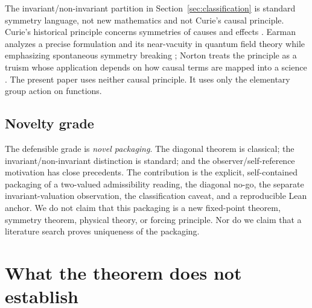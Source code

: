 \documentclass[11pt]{article}
\theoremstyle{definition}
\theoremstyle{remark}
\begin{document}
The invariant/non-invariant partition in Section~\ref{sec:classification} is standard symmetry language, not new mathematics and not Curie's causal principle. Curie's historical principle concerns symmetries of causes and effects \cite{curie1894}. Earman analyzes a precise formulation and its near-vacuity in quantum field theory while emphasizing spontaneous symmetry breaking \cite{earman2004}; Norton treats the principle as a truism whose application depends on how causal terms are mapped into a science \cite{norton2016}. The present paper uses neither causal principle. It uses only the elementary group action on functions.

\subsection{Novelty grade}

The defensible grade is \emph{novel packaging}. The diagonal theorem is classical; the invariant/non-invariant distinction is standard; and the observer/self-reference motivation has close precedents. The contribution is the explicit, self-contained packaging of a two-valued admissibility reading, the diagonal no-go, the separate invariant-valuation observation, the classification caveat, and a reproducible Lean anchor. We do not claim that this packaging is a new fixed-point theorem, symmetry theorem, physical theory, or forcing principle. Nor do we claim that a literature search proves uniqueness of the packaging.

\section{What the theorem does not establish}
\label{sec:limits}
\end{document}
